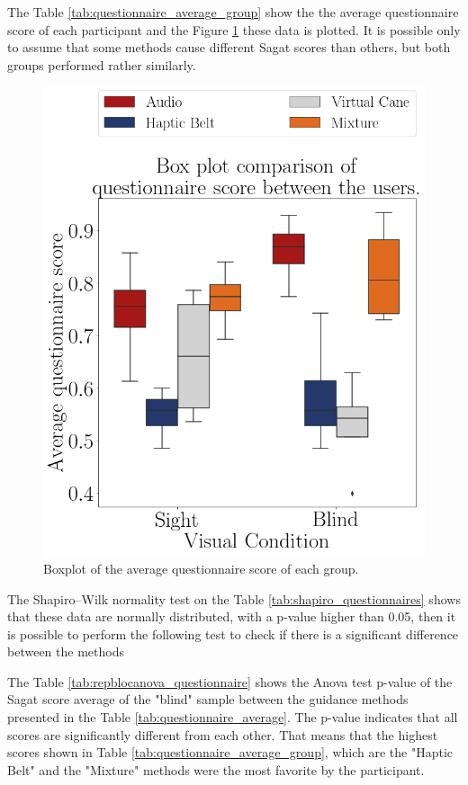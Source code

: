 The Table \ref{tab:questionnaire_average_group} show the the average questionnaire score of each participant and the Figure \ref{fig:boxplot_questionnaire_scene} these data is plotted. It is possible only to assume that some methods cause different Sagat scores than others, but both groups performed rather similarly.



\begin{figure}[!htb]
    \centering
    \includegraphics[width = 0.5\linewidth]{Resultados/Questionario/Figuras/png/boxplot_questionnaire_scene.png}
    \caption{Boxplot of the average questionnaire score of each group.}
    \label{fig:boxplot_questionnaire_scene}
\end{figure}

The Shapiro–Wilk normality test on the Table \ref{tab:shapiro_questionnaires} shows that these data are normally distributed, with a p-value higher than 0.05, then it is possible to perform the following test to check if there is a significant difference between the methods



The Table \ref{tab:repblocanova_questionnaire} shows the Anova test p-value of the Sagat score average of the "blind" sample between the guidance methods presented in the Table \ref{tab:questionnaire_average}. The p-value indicates that all scores are significantly different from each other. That means that the highest scores shown in Table \ref{tab:questionnaire_average_group}, which are the "Haptic Belt" and the "Mixture" methods were the most favorite by the participant.



\FloatBarrier